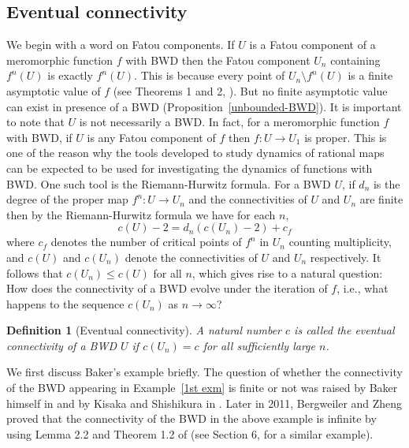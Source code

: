 \documentclass[11pt,a4paper]{article}
\newtheorem{definition}{Definition}[section]
\begin{document}
	\subsection{Eventual connectivity}
	\par
We begin with a word on Fatou components. If $U$ is a Fatou component of a meromorphic function $f$ with BWD then the Fatou component $U_n$ containing $f^n (U)$ is exactly $f^n(U)$. This is because every point of $ U_n \setminus f^n(U)$ is a finite asymptotic value of $f$ (see Theorems 1 and 2, \cite{Herring-1998}). But no finite asymptotic value can  exist in presence of a BWD (Proposition~\ref{unbounded-BWD}).  It is important to note that $U$ is not necessarily a BWD. In fact, for a meromorphic function $f$ with BWD, if $U$ is any Fatou component of $f$ then $f: U \to U_1$ is proper.
This is one of the reason why the tools developed to study dynamics of rational maps can be expected to be used for investigating the dynamics of functions with BWD. One such tool is the Riemann-Hurwitz formula. For a BWD $U$, if $d_n$ is the degree of the proper map $f^n: U\to U_n$ and the  connectivities of $U$ and $U_n$  are finite then by the Riemann-Hurwitz formula we have for each $n$, 
	$$c(U)-2=d_n\left(c(U_n)-2\right)+c_f$$ where $c_f$ denotes the number of critical points of $f^n$ in $U_n$ counting multiplicity, and   $c(U)$ and $c(U_n)$ denote the connectivities of $U$ and $U_n$ respectively. It follows that $c(U_n)\leq c(U)$ for all $n $, which gives rise to a natural question: How does the connectivity of a BWD evolve under the iteration of $f$, i.e., what happens to the sequence $c(U_n)$ as $n \to \infty$?  
\begin{definition}[Eventual connectivity]
	 A natural number $c$ is called the eventual connectivity of a BWD $U$ if  $c(U_n)=c$ for all sufficiently large $n$. 
\end{definition}

We first discuss Baker's example briefly. The question of whether the connectivity of the BWD appearing in Example~\ref{1st exm} is finite or not was raised by
		Baker himself in \cite{Baker 1988} and  by Kisaka and Shishikura in \cite{KisakaShishikura 2008}. Later in 2011, Bergweiler and Zheng proved that the connectivity of the BWD in the above example is infinite by using Lemma 2.2 and Theorem 1.2 of \cite{BergZheng 2011} (see Section 6, \cite{BergZheng 2011} for a similar example). 
	
\end{document}
